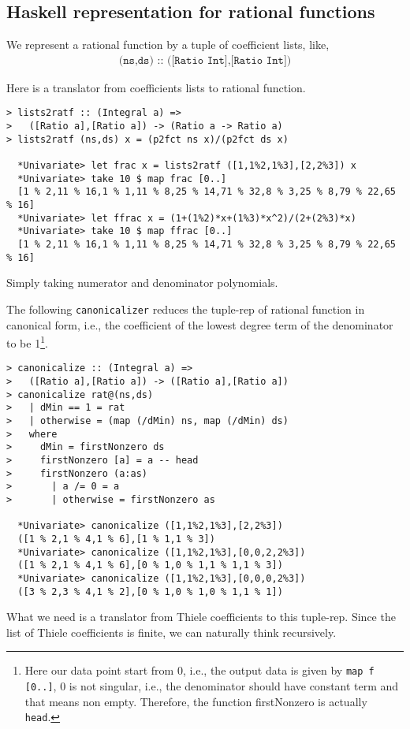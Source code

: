 \documentclass[11pt]{book}
\begin{document}
\subsection{Haskell representation for rational functions}
We represent a rational function by a tuple of coefficient lists, like,
\begin{eqnarray}
\texttt{(ns,ds) :: ([Ratio Int],[Ratio Int])}
\end{eqnarray}

Here is a translator from coefficients lists to rational function.
\begin{verbatim}
> lists2ratf :: (Integral a) => 
>   ([Ratio a],[Ratio a]) -> (Ratio a -> Ratio a)
> lists2ratf (ns,ds) x = (p2fct ns x)/(p2fct ds x)

  *Univariate> let frac x = lists2ratf ([1,1%2,1%3],[2,2%3]) x
  *Univariate> take 10 $ map frac [0..]
  [1 % 2,11 % 16,1 % 1,11 % 8,25 % 14,71 % 32,8 % 3,25 % 8,79 % 22,65 % 16]
  *Univariate> let ffrac x = (1+(1%2)*x+(1%3)*x^2)/(2+(2%3)*x)
  *Univariate> take 10 $ map ffrac [0..]
  [1 % 2,11 % 16,1 % 1,11 % 8,25 % 14,71 % 32,8 % 3,25 % 8,79 % 22,65 % 16]  
\end{verbatim}
Simply taking numerator and denominator polynomials.

The following \texttt{canonicalizer} reduces the tuple-rep of rational function in canonical form, i.e., the coefficient of the lowest degree term of the denominator to be 1\footnote{
Here our data point start from 0, i.e., the output data is given by \texttt{map f [0..]}, 0 is not singular, i.e., the denominator should have constant term and that means non empty.
Therefore, the function firstNonzero is actually \texttt{head}.
}.
\begin{verbatim}
> canonicalize :: (Integral a) => 
>   ([Ratio a],[Ratio a]) -> ([Ratio a],[Ratio a])
> canonicalize rat@(ns,ds)
>   | dMin == 1 = rat
>   | otherwise = (map (/dMin) ns, map (/dMin) ds)
>   where
>     dMin = firstNonzero ds
>     firstNonzero [a] = a -- head
>     firstNonzero (a:as)
>       | a /= 0 = a
>       | otherwise = firstNonzero as

  *Univariate> canonicalize ([1,1%2,1%3],[2,2%3])
  ([1 % 2,1 % 4,1 % 6],[1 % 1,1 % 3])
  *Univariate> canonicalize ([1,1%2,1%3],[0,0,2,2%3])
  ([1 % 2,1 % 4,1 % 6],[0 % 1,0 % 1,1 % 1,1 % 3])
  *Univariate> canonicalize ([1,1%2,1%3],[0,0,0,2%3])
  ([3 % 2,3 % 4,1 % 2],[0 % 1,0 % 1,0 % 1,1 % 1])
\end{verbatim}

What we need is a translator from Thiele coefficients to this tuple-rep.
Since the list of Thiele coefficients is finite, we can naturally think recursively.
\end{document}
